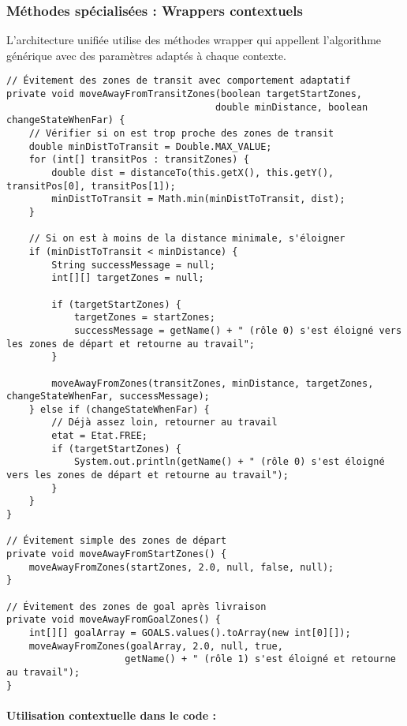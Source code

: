\documentclass[12pt,a4paper]{article}
\begin{document}
\subsubsection{Méthodes spécialisées : Wrappers contextuels}

L'architecture unifiée utilise des méthodes wrapper qui appellent l'algorithme générique avec des paramètres adaptés à chaque contexte.

\begin{lstlisting}[caption=Wrappers spécialisés pour chaque contexte]
// Évitement des zones de transit avec comportement adaptatif
private void moveAwayFromTransitZones(boolean targetStartZones,
                                     double minDistance, boolean changeStateWhenFar) {
    // Vérifier si on est trop proche des zones de transit
    double minDistToTransit = Double.MAX_VALUE;
    for (int[] transitPos : transitZones) {
        double dist = distanceTo(this.getX(), this.getY(), transitPos[0], transitPos[1]);
        minDistToTransit = Math.min(minDistToTransit, dist);
    }

    // Si on est à moins de la distance minimale, s'éloigner
    if (minDistToTransit < minDistance) {
        String successMessage = null;
        int[][] targetZones = null;

        if (targetStartZones) {
            targetZones = startZones;
            successMessage = getName() + " (rôle 0) s'est éloigné vers les zones de départ et retourne au travail";
        }

        moveAwayFromZones(transitZones, minDistance, targetZones, changeStateWhenFar, successMessage);
    } else if (changeStateWhenFar) {
        // Déjà assez loin, retourner au travail
        etat = Etat.FREE;
        if (targetStartZones) {
            System.out.println(getName() + " (rôle 0) s'est éloigné vers les zones de départ et retourne au travail");
        }
    }
}

// Évitement simple des zones de départ
private void moveAwayFromStartZones() {
    moveAwayFromZones(startZones, 2.0, null, false, null);
}

// Évitement des zones de goal après livraison
private void moveAwayFromGoalZones() {
    int[][] goalArray = GOALS.values().toArray(new int[0][]);
    moveAwayFromZones(goalArray, 2.0, null, true,
                     getName() + " (rôle 1) s'est éloigné et retourne au travail");
}
\end{lstlisting}

\paragraph{Utilisation contextuelle dans le code :}
\end{document}

